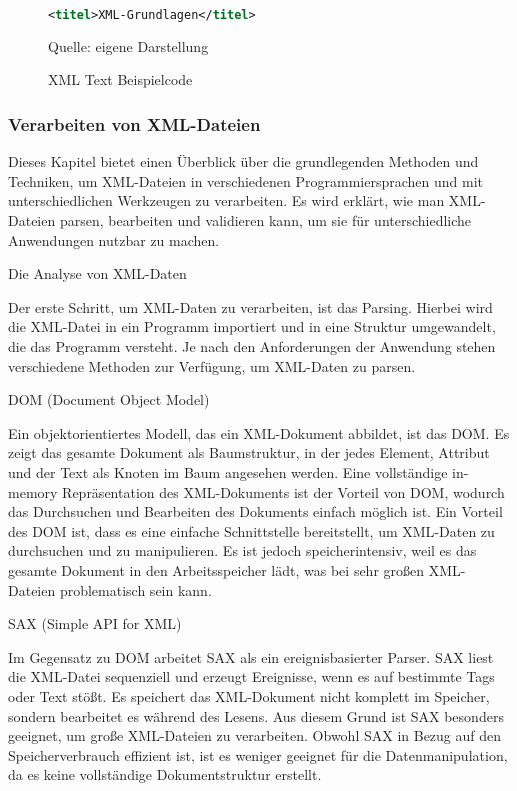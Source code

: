 \begin{figure}[H]
\centering
\begin{minipage}{0.95\textwidth}
\begin{lstlisting}[language=XML]
<titel>XML-Grundlagen</titel>
\end{lstlisting}
\end{minipage}
\caption{XML Text Beispielcode}
\label{fig:XML Text Beispielcode}
    {Quelle: eigene Darstellung}
\end{figure}
\cite*{Becher2022}


\subsubsection{Verarbeiten von XML-Dateien}

Dieses Kapitel bietet einen Überblick über die grundlegenden Methoden und Techniken, um \ac{XML}-Dateien in verschiedenen Programmiersprachen und mit unterschiedlichen Werkzeugen zu verarbeiten.
Es wird erklärt, wie man \ac{XML}-Dateien parsen, bearbeiten und validieren kann, um sie für unterschiedliche Anwendungen nutzbar zu machen.

Die Analyse von \ac{XML}-Daten

Der erste Schritt, um \ac{XML}-Daten zu verarbeiten, ist das Parsing.
Hierbei wird die \ac{XML}-Datei in ein Programm importiert und in eine Struktur umgewandelt, die das Programm versteht.
Je nach den Anforderungen der Anwendung stehen verschiedene Methoden zur Verfügung, um \ac{XML}-Daten zu parsen.

DOM (Document Object Model)

Ein objektorientiertes Modell, das ein \ac{XML}-Dokument abbildet, ist das DOM.
Es zeigt das gesamte Dokument als Baumstruktur, in der jedes Element, Attribut und der Text als Knoten im Baum angesehen werden.
Eine vollständige in-memory Repräsentation des \ac{XML}-Dokuments ist der Vorteil von DOM, wodurch das Durchsuchen und Bearbeiten des Dokuments einfach möglich ist.
Ein Vorteil des DOM ist, dass es eine einfache Schnittstelle bereitstellt, um \ac{XML}-Daten zu durchsuchen und zu manipulieren.
Es ist jedoch speicherintensiv, weil es das gesamte Dokument in den Arbeitsspeicher lädt, was bei sehr großen \ac{XML}-Dateien problematisch sein kann.

SAX (Simple API for \ac{XML})

Im Gegensatz zu DOM arbeitet SAX als ein ereignisbasierter Parser.
SAX liest die \ac{XML}-Datei sequenziell und erzeugt Ereignisse, wenn es auf bestimmte Tags oder Text stößt.
Es speichert das \ac{XML}-Dokument nicht komplett im Speicher, sondern bearbeitet es während des Lesens.
Aus diesem Grund ist SAX besonders geeignet, um große \ac{XML}-Dateien zu verarbeiten.
Obwohl SAX in Bezug auf den Speicherverbrauch effizient ist, ist es weniger geeignet für die Datenmanipulation, da es keine vollständige Dokumentstruktur erstellt.

